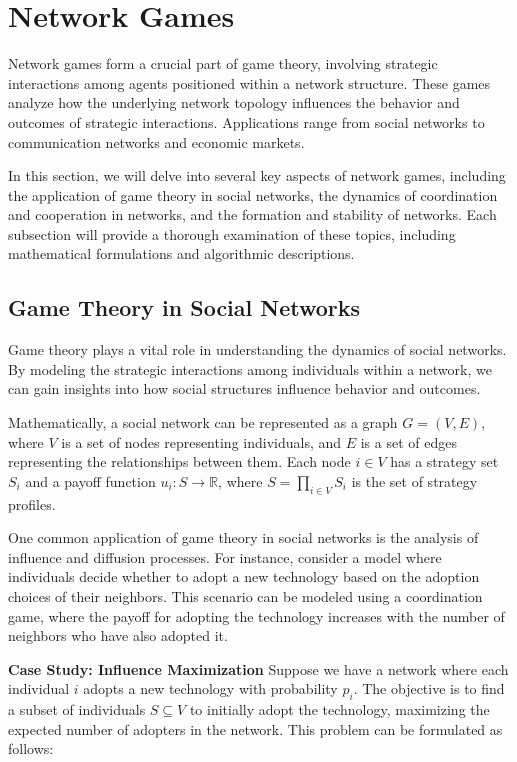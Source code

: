 \documentclass[12pt]{book} %
\begin{document}
\section{Network Games}
Network games form a crucial part of game theory, involving strategic interactions among agents positioned within a network structure. These games analyze how the underlying network topology influences the behavior and outcomes of strategic interactions. Applications range from social networks to communication networks and economic markets.

In this section, we will delve into several key aspects of network games, including the application of game theory in social networks, the dynamics of coordination and cooperation in networks, and the formation and stability of networks. Each subsection will provide a thorough examination of these topics, including mathematical formulations and algorithmic descriptions.

\subsection{Game Theory in Social Networks}
Game theory plays a vital role in understanding the dynamics of social networks. By modeling the strategic interactions among individuals within a network, we can gain insights into how social structures influence behavior and outcomes.

Mathematically, a social network can be represented as a graph $G = (V, E)$, where $V$ is a set of nodes representing individuals, and $E$ is a set of edges representing the relationships between them. Each node $i \in V$ has a strategy set $S_i$ and a payoff function $u_i: S \to \mathbb{R}$, where $S = \prod_{i \in V} S_i$ is the set of strategy profiles.

One common application of game theory in social networks is the analysis of influence and diffusion processes. For instance, consider a model where individuals decide whether to adopt a new technology based on the adoption choices of their neighbors. This scenario can be modeled using a coordination game, where the payoff for adopting the technology increases with the number of neighbors who have also adopted it.

\textbf{Case Study: Influence Maximization}
Suppose we have a network where each individual $i$ adopts a new technology with probability $p_i$. The objective is to find a subset of individuals $S \subseteq V$ to initially adopt the technology, maximizing the expected number of adopters in the network. This problem can be formulated as follows:
\end{document}

